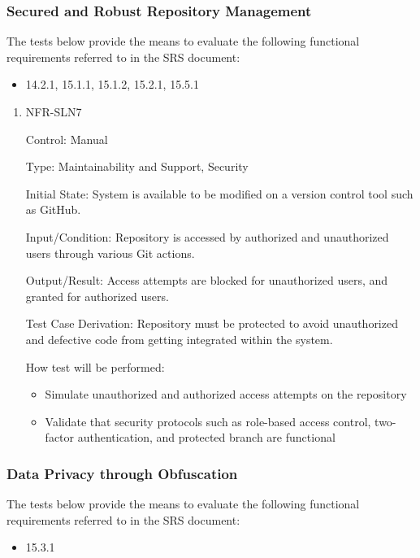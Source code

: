 \documentclass[12pt, titlepage]{article}
\begin{document}
\subsubsection{Secured and Robust Repository Management}

The tests below provide the means to evaluate the following functional requirements referred to in the SRS document:
\begin{itemize}
  \item 14.2.1, 15.1.1, 15.1.2, 15.2.1, 15.5.1
\end{itemize}

\begin{enumerate}
\item NFR-SLN7

Control: Manual

Type: Maintainability and Support, Security

Initial State: System is available to be modified on a version control tool such as GitHub.

Input/Condition: Repository is accessed by authorized and unauthorized users through various Git actions.

Output/Result: Access attempts are blocked for unauthorized users, and granted for authorized users.

Test Case Derivation: Repository must be protected to avoid unauthorized and defective code from getting integrated within the system.

How test will be performed:
\begin{itemize}
  \item Simulate unauthorized and authorized access attempts on the repository
  \item Validate that security protocols such as role-based access control, two-factor authentication, and protected branch are functional
\end{itemize}

\end{enumerate}

\subsubsection{Data Privacy through Obfuscation}

The tests below provide the means to evaluate the following functional requirements referred to in the SRS document:
\begin{itemize}
  \item 15.3.1
\end{itemize}
\end{document}
